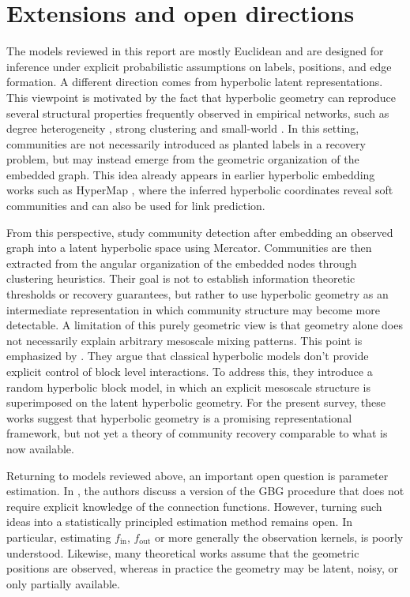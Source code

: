 \documentclass[runningheads]{llncs}
\begin{document}
\section{Extensions and open directions}

The models reviewed in this report are mostly Euclidean and are designed for inference under explicit probabilistic assumptions on labels, positions, and edge formation. A different direction comes from hyperbolic latent representations. This viewpoint is motivated by the fact that hyperbolic geometry can reproduce several structural properties frequently observed in empirical networks, such as degree heterogeneity \citep{Baraba_si_1999}, strong clustering \citep{Krioukov_2016} and small-world \citep{watts1998collective}. 
In this setting, communities are not necessarily introduced as planted labels in a recovery problem, but may instead emerge from the geometric organization of the embedded graph.
This idea already appears in earlier hyperbolic embedding works such as HyperMap \citep{Papadopoulos_2015}, where the inferred hyperbolic coordinates reveal soft communities and can also be used for link prediction.

From this perspective, \citep{bruno2019community} study community detection after embedding an observed graph into a latent hyperbolic space using Mercator. Communities are then extracted from the angular organization of the embedded nodes through clustering heuristics. Their goal is not to establish information theoretic thresholds or recovery guarantees, but rather to use hyperbolic geometry as an intermediate representation in which community structure may become more detectable.
A limitation of this purely geometric view is that geometry alone does not necessarily explain arbitrary mesoscale mixing patterns. This point is emphasized by \citep{guarino2025random}. They argue that classical hyperbolic models don't provide explicit control of block level interactions. To address this, they introduce a random hyperbolic block model, in which an explicit mesoscale structure is superimposed on the latent hyperbolic geometry. For the present survey, these works suggest that hyperbolic geometry is a promising representational framework, but not yet a theory of community recovery comparable to what is now available.

Returning to models reviewed above, an important open question is parameter estimation. In \citep{abbe2021community}, the authors discuss a version of the GBG procedure that does not require explicit knowledge of the connection functions. However, turning such ideas into a statistically principled estimation method remains open.
In particular, estimating $f_{\mathrm{in}}$, $f_{\mathrm{out}}$ or more generally the observation kernels, is poorly understood.
Likewise, many theoretical works assume that the geometric positions are observed, whereas in practice the geometry may be latent, noisy, or only partially available.
\end{document}

